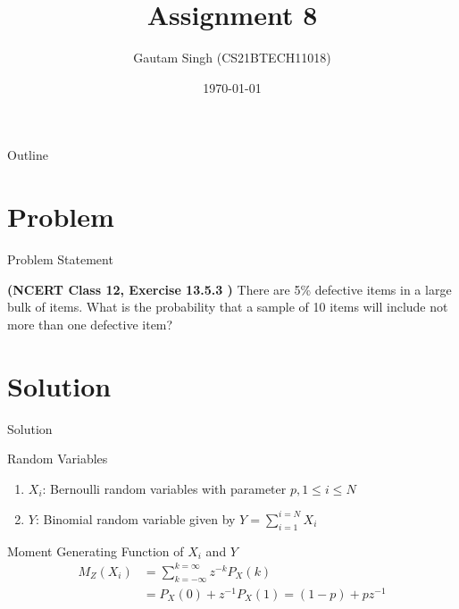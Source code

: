 \documentclass{beamer}
\title{Assignment 8}
\author{Gautam Singh (CS21BTECH11018)}
\date{\today}
\begin{document}
\begin{frame}
    \titlepage 
\end{frame}

\logo{}


\begin{frame}{Outline}
    \tableofcontents
\end{frame}


\section{Problem}
\begin{frame}{Problem Statement}

\textbf{(NCERT Class 12, Exercise 13.5.3 )} There are 5\% defective items in a large bulk of items. What is the probability that a sample of 10 items will include not more than one defective item?

\end{frame}


\section{Solution}
\begin{frame}{Solution}
    \begin{block}{Random Variables}
        \begin{enumerate}
        		\item $X_i$: Bernoulli random variables with parameter $p, 1 \leq i \leq N$
        		\item $Y$: Binomial random variable given by $Y = \sum_{i = 1}^{i = N}X_i$
        \end{enumerate}
    \end{block}
    \begin{exampleblock}{Moment Generating Function of $X_i$ and $Y$}
		\begin{align}
			M_Z(X_i) &= \sum_{k = -\infty}^{k = \infty}z^{-k}P_X(k) \\
			&= P_X(0) + z^{-1}P_X(1) = (1 - p) + pz^{-1} \\
			\label{mgf-X}
		\end{align}
    \end{exampleblock}
\end{frame} 
\end{document}
